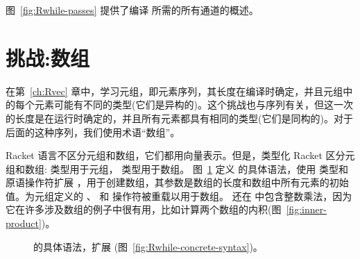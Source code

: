 \documentclass[11pt]{book}
\newcommand{\gray}[1]{{\color{gray} #1}}
\begin{document}
图~\ref{fig:Rwhile-passes} 提供了编译 \LangLoop{} 所需的所有通道的概述。


\section{挑战:数组}
\label{sec:arrays}

在第~\ref{ch:Rvec} 章中，学习元组，即元素序列，其长度在编译时确定，并且元组中的每个元素可能有不同的类型(它们是异构的)。这个挑战也与序列有关，但这一次的长度是在运行时确定的，并且所有元素都具有相同的类型(它们是同构的)。对于后面的这种序列，我们使用术语“数组”。

 Racket 语言不区分元组和数组，它们都用向量表示。但是，类型化 Racket 区分元组和数组:  类型用于元组，  类型用于数组。
%
图~\ref{fig:Rvecof-concrete-syntax} 定义 \LangArray{} 的具体语法，使用  类型和  原语操作符扩展  \LangLoop{} ，用于创建数组，其参数是数组的长度和数组中所有元素的初始值。为元组定义的  、 和  操作符被重载以用于数组。
%
还在 \LangArray{} 中包含整数乘法，因为它在许多涉及数组的例子中很有用，比如计算两个数组的内积(图~\ref{fig:inner-product})。


\begin{figure}[tp]
\centering
\fbox{
  \begin{minipage}{0.96\textwidth}
    \small
\[
\begin{array}{lcl}
  \Type &::=& \ldots \mid \LP \key{Vectorof}~\Type \RP \\
  \Exp &::=& \gray{ \Int \mid \CREAD{} \mid \CNEG{\Exp}
     \mid \CADD{\Exp}{\Exp} \mid \CSUB{\Exp}{\Exp} }  \mid \CMUL{\Exp}{\Exp}\\
    &\mid&  \gray{ \Var \mid \CLET{\Var}{\Exp}{\Exp} }\\
    &\mid& \gray{\key{\#t} \mid \key{\#f} 
     \mid \LP\key{and}\;\Exp\;\Exp\RP 
     \mid \LP\key{or}\;\Exp\;\Exp\RP 
     \mid \LP\key{not}\;\Exp\RP } \\
    &\mid& \gray{ \LP\key{eq?}\;\Exp\;\Exp\RP \mid \CIF{\Exp}{\Exp}{\Exp} } \\
    &\mid& \gray{ \LP\key{vector}\;\Exp\ldots\RP \mid
          \LP\key{vector-ref}\;\Exp\;\Int\RP} \\
    &\mid& \gray{\LP\key{vector-set!}\;\Exp\;\Int\;\Exp\RP\mid \LP\key{void}\RP
    \mid \LP\Exp \; \Exp\ldots\RP } \\
    &\mid& \gray{ \LP \key{procedure-arity}~\Exp\RP 
    \mid \CLAMBDA{\LP\LS\Var \key{:} \Type\RS\ldots\RP}{\Type}{\Exp} } \\
  &\mid& \gray{ \CSETBANG{\Var}{\Exp}
  \mid \CBEGIN{\Exp\ldots}{\Exp}
  \mid \CWHILE{\Exp}{\Exp} } \\
  &\mid& \CMAKEVEC{\Exp}{\Exp} \\
  \Def &::=& \gray{ \CDEF{\Var}{\LS\Var \key{:} \Type\RS\ldots}{\Type}{\Exp} } \\
  \LangArray{} &::=& \gray{\Def\ldots \; \Exp}
\end{array}
\]
\end{minipage}
}
\caption{ \LangArray{} 的具体语法，扩展 \LangLoop{} (图~\ref{fig:Rwhile-concrete-syntax})。}
\label{fig:Rvecof-concrete-syntax}
\end{figure}
\end{document}
